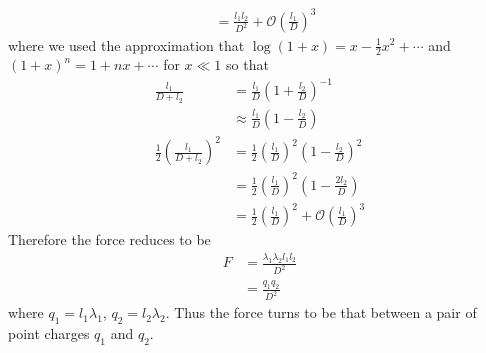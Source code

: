 \documentclass[solutions]{esg8022pset}
\begin{document}
\begin{enumerate}[(a)]
\begin{align*}
        & = \frac{l_1 l_2}{D^2} + \mathcal O\left(\frac{l_1}{D}\right)^3
    \end{align*}
    where we used the approximation that $\log(1 + x) = x - \frac12x^2 + \cdots$ and $(1 + x)^n = 1 + nx + \cdots$ for $x \ll 1$ so that
    \begin{align*}
      \frac{l_1}{D + l_2} & = \frac{l_1}{D}(1 + \frac{l_2}{D})^{-1} \\
        & \approx \frac{l_1}{D}(1 - \frac{l_2}{D}) \\
      \frac12 \left(\frac{l_1}{D + l_2}\right)^2 & = \frac12 \left(\frac{l_1}{D}\right)^2(1 - \frac{l_2}{D})^2 \\
        & = \frac12 \left(\frac{l_1}{D}\right)^2(1 - \frac{2l_2}{D}) \\
        & = \frac12 \left(\frac{l_1}{D}\right)^2 + \mathcal O\left(\frac{l_1}{D}\right)^3
    \end{align*}
    Therefore the force reduces to be
    \begin{align*}
      F & = \frac{\lambda_1 \lambda_2 l_1 l_2}{D^2} \\
        & = \frac{q_1 q_2}{D^2}
    \end{align*}
    where $q_1 = l_1\lambda_1$, $q_2 = l_2\lambda_2$.  Thus the force turns to be that between a pair of point charges $q_1$ and $q_2$.
  \end{enumerate}
\end{document}
